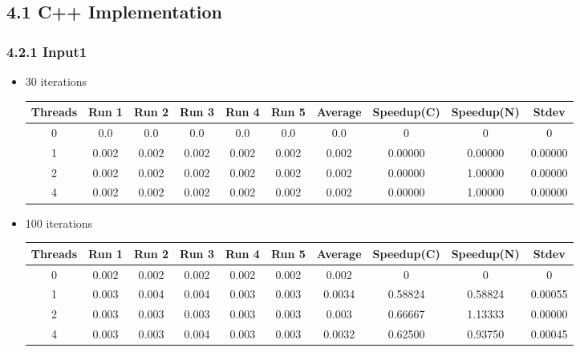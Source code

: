 \subsection*{4.1 C++ Implementation}\subsubsection*{4.2.1 Input1} 
 \begin{itemize}
\item 30 iterations
\begin{center}
 \begin{adjustbox}{width=\columnwidth, center} 
 \begin{tabular}{ | |c | c c c c c | c | c c | c | |} \hline 
 Threads & Run 1 & Run 2 & Run 3 & Run 4 & Run 5 & Average & Speedup(C) & Speedup(N) & Stdev \\ [0.5ex] 
 \hline 
 \hline 
0& 0.0 & 0.0 & 0.0 & 0.0 & 0.0 & 0.0 & 0 & 0 & 0\\ 
 \hline
1& 0.002 & 0.002 & 0.002 & 0.002 & 0.002 & 0.002 & 0.00000 & 0.00000 & 0.00000\\ 
 \hline
2& 0.002 & 0.002 & 0.002 & 0.002 & 0.002 & 0.002 & 0.00000 & 1.00000 & 0.00000\\ 
 \hline
4& 0.002 & 0.002 & 0.002 & 0.002 & 0.002 & 0.002 & 0.00000 & 1.00000 & 0.00000\\ 
 \hline
\end{tabular} 
 \end{adjustbox} 
 \end{center} 
\item 100 iterations
\begin{center}
 \begin{adjustbox}{width=\columnwidth, center} 
 \begin{tabular}{ | |c | c c c c c | c | c c | c | |} \hline 
 Threads & Run 1 & Run 2 & Run 3 & Run 4 & Run 5 & Average & Speedup(C) & Speedup(N) & Stdev \\ [0.5ex] 
 \hline 
 \hline 
0& 0.002 & 0.002 & 0.002 & 0.002 & 0.002 & 0.002 & 0 & 0 & 0\\ 
 \hline
1& 0.003 & 0.004 & 0.004 & 0.003 & 0.003 & 0.0034 & 0.58824 & 0.58824 & 0.00055\\ 
 \hline
2& 0.003 & 0.003 & 0.003 & 0.003 & 0.003 & 0.003 & 0.66667 & 1.13333 & 0.00000\\ 
 \hline
4& 0.003 & 0.003 & 0.004 & 0.003 & 0.003 & 0.0032 & 0.62500 & 0.93750 & 0.00045\\ 
 \hline
\end{tabular} 
 \end{adjustbox} 

\end{center}
\end{itemize}
